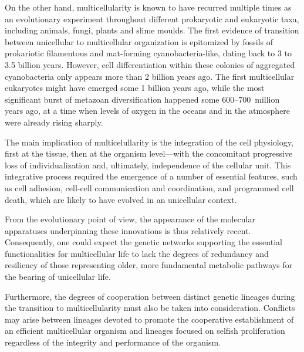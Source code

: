 
On the other hand, multicellularity is known to have recurred multiple times as
an evolutionary experiment throughout different prokaryotic and eukaryotic taxa,
including animals, fungi, plants and slime moulds.\cite{kaiser_building_2001}
The first evidence of transition between unicellular to multicellular
organization is epitomized by fossils of prokariotic filamentous and
\mbox{mat-forming} \mbox{cyanobacteria-like}, dating back to 3 to 3.5 billion
years.\cite{knoll_life_2003,schopf_microfossils_1993} However, cell
differentiation within these colonies of aggregated cyanobacteria only appears
more than 2 billion years ago.\cite{tomitani_evolutionary_2006} The first
multicellular eukaryotes might have emerged some 1 billion years
ago,\cite{knoll_eukaryotic_2006} while the most significant burst of metazoan
diversification happened some \mbox{600--700~million} years ago, at a time when
levels of oxygen in the oceans and in the atmosphere were already rising
sharply.\cite{carroll_chance_2001,king_unicellular_2004}

The main implication of multicelullarity is the integration of the cell
physiology, first at the tissue, then at the organism level---with the
concomitant progressive loss of individualization and, ultimately, independence
of the cellular unit.  This integrative process required the emergence of a
number of essential features, such as cell adhesion, \mbox{cell-cell}
communication and coordination, and programmed cell death, which are likely to
have evolved in an unicellular
context.\cite{bonner_development:_1974,bonner_first_2009,kaiser_building_2001}

From the evolutionary point of view, the appearance of the molecular apparatuses
underpinning these innovations is thus relatively recent.  Consequently, one
could expect the genetic networks supporting the essential functionalities for
multicellular life to lack the degrees of redundancy and resiliency of those
representing older, more fundamental metabolic pathways for the bearing of
unicellular life.

Furthermore, the degrees of cooperation between distinct genetic lineages during
the transition to multicellularity must also be taken into consideration.
Conflicts may arise between lineages devoted to promote the cooperative
establishment of an efficient multicellular organism and lineages focused on
selfish proliferation regardless of the integrity and performance of the
organism.\cite{buss_evolution_1987,hammerstein_genetic_2003}

